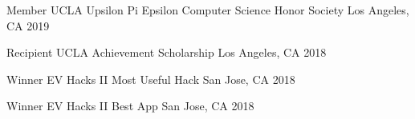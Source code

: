 



\begin{cvhonors}

\cvhonor
  {Member} %
  {UCLA Upsilon Pi Epsilon Computer Science Honor Society} %
  {Los Angeles, CA} %
  {2019} %

  \cvhonor
    {Recipient} %
    {UCLA Achievement Scholarship} %
    {Los Angeles, CA} %
    {2018} %

  \cvhonor
    {Winner} %
    {EV Hacks II Most Useful Hack} %
    {San Jose, CA} %
    {2018} %

  \cvhonor
    {Winner} %
    {EV Hacks II Best App} %
    {San Jose, CA} %
    {2018} %

\end{cvhonors}
